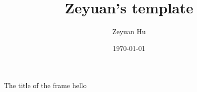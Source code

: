 \documentclass{beamer}
\title{Zeyuan's template}
\author{Zeyuan Hu}
\institute{IBM}
\date{\today}
\begin{document}
\begin{frame}
\titlepage
\end{frame}

\begin{frame}{The title of the frame}
hello
\end{frame}
\end{document}
